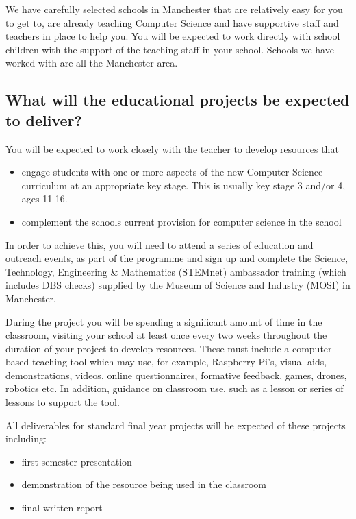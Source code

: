 \documentclass[12pt,]{book}
\providecommand{\tightlist}{%
  \setlength{\itemsep}{0pt}\setlength{\parskip}{0pt}}
\begin{document}
We have carefully selected schools in Manchester that are relatively easy for you to get to, are already teaching Computer Science and have supportive staff and teachers in place to help you. You will be expected to work directly with school children with the support of the teaching staff in your school. Schools we have worked with are all the Manchester area.

\hypertarget{what-will-the-educational-projects-be-expected-to-deliver}{%
\subsection{What will the educational projects be expected to deliver?}\label{what-will-the-educational-projects-be-expected-to-deliver}}

You will be expected to work closely with the teacher to develop resources that

\begin{itemize}
\tightlist
\item
  engage students with one or more aspects of the new Computer Science curriculum at an appropriate key stage. This is usually key stage 3 and/or 4, ages 11-16.
\item
  complement the schools current provision for computer science in the school
\end{itemize}

In order to achieve this, you will need to attend a series of education and outreach events, as part of the programme and sign up and complete the Science, Technology, Engineering \& Mathematics (STEMnet) ambassador training (which includes DBS checks) supplied by the Museum of Science and Industry (MOSI) in Manchester.

During the project you will be spending a significant amount of time in the classroom, visiting your school at least once every two weeks throughout the duration of your project to develop resources. These must include a computer-based teaching tool which may use, for example, Raspberry Pi's, visual aids, demonstrations, videos, online questionnaires, formative feedback, games, drones, robotics etc. In addition, guidance on classroom use, such as a lesson or series of lessons to support the tool.

All deliverables for standard final year projects will be expected of these projects including:

\begin{itemize}
\tightlist
\item
  first semester presentation
\item
  demonstration of the resource being used in the classroom
\item
  final written report
\end{itemize}
\end{document}
